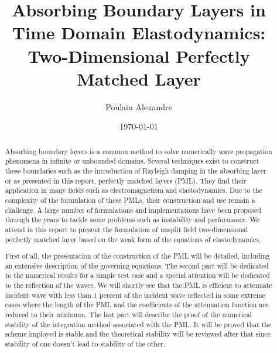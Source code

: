 \documentclass[11pt]{article}
\title{Absorbing Boundary Layers in Time Domain Elastodynamics: Two-Dimensional Perfectly Matched Layer}
\author{Poulain Alexandre}
\date{\today}
\begin{document}
\pagestyle{empty}


\newpage
\renewcommand{\abstractname}{Abstract}
\begin{abstract}
Absorbing boundary layers is a common method to solve numerically wave propagation phenomena in infinite or unbounded domains. Several techniques exist to construct these boundaries such as the introduction of Rayleigh damping in the absorbing layer or as presented in this report, perfectly matched layers (PML). They find their application in many fields such as electromagnetism and elastodynamics.   
Due to the complexity of the formulation of these PMLs, their construction and use remain a challenge. A large number of formulations and implementations have been proposed through the years to tackle some problems such as instability and performance.  
We attend in this report to present the formulation of unsplit field two-dimensional perfectly matched layer based on the weak form of the equations of elastodynamics. 

\noindent First of all, the presentation of the construction of the PML will be detailed, including an extensive description of the governing equations. The second part will be dedicated to the numerical results for a simple test case and a special attention will be dedicated to the reflection of the waves. We will shortly see that the PML is efficient to attenuate incident wave with less than $1$ percent of the incident wave reflected in some extreme cases where the length of the PML and the coefficients of the attenuation function are reduced to their minimum. The last part will describe the proof of the numerical stability of the integration method associated with the PML. It will be proved that the scheme imployed is stable and the theoretical stability will be reviewed after that since stability of one doesn't lead to stability of the other.    






\end{abstract}


\newpage

\tableofcontents

\newpage


\newpage


\newpage


\newpage



\newpage


\end{document}

